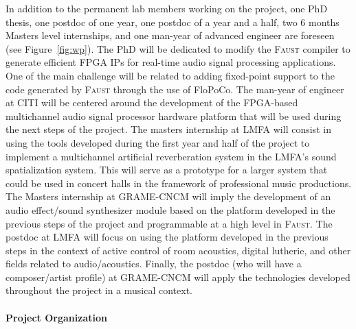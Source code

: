 \documentclass[a4paper,10pt]{article}
\newcommand{\F}{\textsc{Faust}}
\begin{document}
In addition to the permanent lab members working on the project, one PhD thesis, one postdoc of one year, one postdoc of a year and a half, two 6 months Masters level internships, and one man-year of advanced engineer are foreseen (see Figure~\ref{fig:wp}). The PhD will be dedicated to modify the \F{} compiler to generate efficient FPGA IPs for real-time audio signal processing applications. One of the main challenge will be related to adding fixed-point support to the code generated by \F{} through the use of FloPoCo. The man-year of engineer at CITI will be centered around the development of the FPGA-based multichannel audio signal processor hardware platform that will be used during the next steps of the project. The masters internship at LMFA will consist in using the tools developed during the first year and half of the project to implement a multichannel artificial reverberation system in the LMFA's sound spatialization system. This will serve as a prototype for a larger system that could be used in concert halls in the framework of professional music productions. The Masters internship at GRAME-CNCM will imply the development of an audio effect/sound synthesizer module based on the platform developed in the previous steps of the project and programmable at a high level in \F{}. The postdoc at LMFA will focus on using the platform developed in the previous steps in the context of active control of room acoustics, digital lutherie, and other fields related to audio/acoustics. Finally, the postdoc (who will have a composer/artist profile) at GRAME-CNCM will apply the technologies developed throughout the project in a musical context.

\paragraph{Project Organization}
\end{document}

